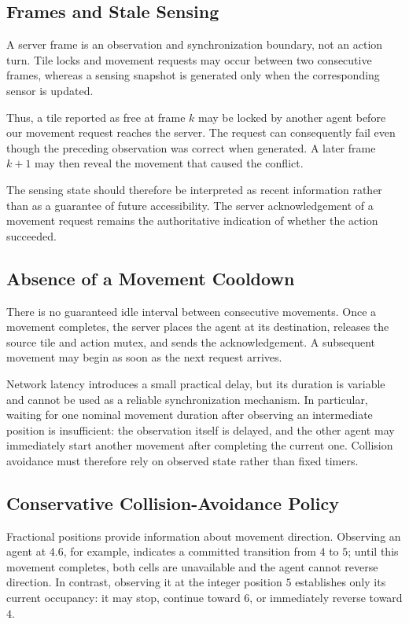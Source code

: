 \documentclass[a4paper]{article}
\begin{document}
\subsection{Frames and Stale Sensing}

A server frame is an observation and synchronization boundary, not an action
turn. Tile locks and movement requests may occur between two consecutive
frames, whereas a sensing snapshot is generated only when the corresponding
sensor is updated.

Thus, a tile reported as free at frame $k$ may be locked by another agent
before our movement request reaches the server. The request can consequently
fail even though the preceding observation was correct when generated. A
later frame $k+1$ may then reveal the movement that caused the conflict.

The sensing state should therefore be interpreted as recent information rather
than as a guarantee of future accessibility. The server acknowledgement of a
movement request remains the authoritative indication of whether the action
succeeded.

\subsection{Absence of a Movement Cooldown}

There is no guaranteed idle interval between consecutive movements. Once a
movement completes, the server places the agent at its destination, releases
the source tile and action mutex, and sends the acknowledgement. A subsequent
movement may begin as soon as the next request arrives.

Network latency introduces a small practical delay, but its duration is
variable and cannot be used as a reliable synchronization mechanism. In
particular, waiting for one nominal movement duration after observing an
intermediate position is insufficient: the observation itself is delayed, and
the other agent may immediately start another movement after completing the
current one. Collision avoidance must therefore rely on observed state rather
than fixed timers.

\subsection{Conservative Collision-Avoidance Policy}

Fractional positions provide information about movement direction. Observing
an agent at $4.6$, for example, indicates a committed transition from $4$ to
$5$; until this movement completes, both cells are unavailable and the agent
cannot reverse direction. In contrast, observing it at the integer position
$5$ establishes only its current occupancy: it may stop, continue toward $6$,
or immediately reverse toward $4$.
\end{document}
